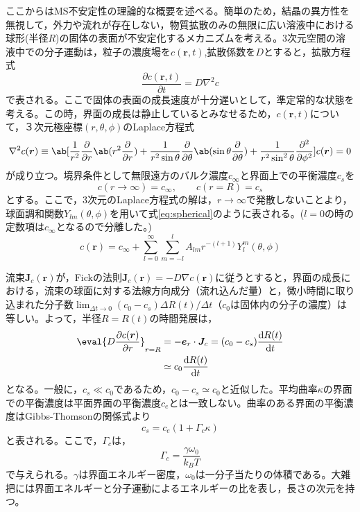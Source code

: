 \documentclass[autodetect-engine,dvi=dvipdfmx,a4paper,ja=standard,oneside,openany,11pt]{bxjsbook}
\begin{document}
ここからはMS不安定性の理論的な概要を述べる。簡単のため，結晶の異方性を無視して，外力や流れが存在しない，物質拡散のみの無限に広い溶液中における球形(半径$R$)の固体の表面が不安定化するメカニズムを考える\cite{フラクタル科学}\cite{mullins1963morphological}。3次元空間の溶液中での分子運動は，粒子の濃度場を$c(\bm{r},t)$,拡散係数を$D$とすると，拡散方程式
\begin{equation}
  \frac{\partial c(\bm{r},t)}{\partial t} = D\nabla^2c
  \label{eq:diffusion}
\end{equation}
で表される。ここで固体の表面の成長速度が十分遅いとして，準定常的な状態を考える。この時，界面の成長は静止しているとみなせるため，$c(\bm{r},t)$について，３次元極座標$(r,\theta,\phi)$のLaplace方程式
\begin{equation}
  \nabla^2c(\bm{r})\equiv \ab[\frac{1}{r^2}\pdv*{\ab(r^2\pdv{}{r})}{r}+\frac{1}{r^2\sin\theta}\pdv*{\ab(\sin\theta\pdv{}{\theta})}{\theta}+\frac{1}{r^2\sin^2\theta}\pdv[2]{}{\phi}]c(\bm{r})=0
  \label{eq:laplace}
\end{equation}
が成り立つ。境界条件として無限遠方のバルク濃度$c_{\infty}$と界面上での平衡濃度$c_s$を
\begin{equation}
  c(r\rightarrow \infty)  = c_{\infty}, \qquad c(r=R)= c_s
  \label{eq:boundary}
\end{equation}
とする。ここで，3次元のLaplace方程式の解は，$r\to\infty$で発散しないことより，球面調和関数$Y_{lm}(\theta,\phi)$を用いて式\eqref{eq:spherical}のように表される。($l=0$の時の定数項は$c_\infty$となるので分離した。)
\begin{equation}
  c(\bm{r}) = c_{\infty} + \sum_{l=0}^{\infty}\sum_{m=-l}^{l}A_{lm}r^{-(l+1)}Y_{l}^{m}(\theta,\phi)
  \label{eq:spherical}
\end{equation}

流束$\bm{J}_c(\bm{r})$が，Fickの法則$\bm{J}_c(\bm{r})=-D\nabla c(\bm{r})$に従うとすると，界面の成長における，流束の球面に対する法線方向成分（流れ込んだ量）と，微小時間に取り込まれた分子数$\lim_{\Delta t\to 0} (c_0-c_s)\Delta R(t)/\Delta t$（$c_0$は固体内の分子の濃度）は等しい。よって，半径$R=R(t)$の時間発展は，
\begin{equation}
  \begin{split}
    \eval{D\pdv{c(\bm{r})}{r}}_{r=R} & = -\bm{e}_r\cdot\bm{J}_c = (c_0-c_s)\odv{R(t)}{t} \\
                                     & \simeq c_0\odv{R(t)}{t}
  \end{split}
  \label{eq:R}
\end{equation}
となる。一般に，$c_s\ll c_0$であるため，$c_0-c_s\simeq c_0$と近似した。平均曲率$\kappa$の界面での平衡濃度は平面界面の平衡濃度$c_e$とは一致しない。曲率のある界面の平衡濃度はGibbs-Thomsonの関係式より
\begin{equation}
  c_s = c_e(1+\Gamma_c \kappa)
  \label{eq:Gibbs-Thomson}
\end{equation}
と表される。ここで，$\Gamma_c$は，
\begin{equation}
  \Gamma_c = \frac{\gamma \omega_0}{k_BT}
\end{equation}
で与えられる。$\gamma$は界面エネルギー密度，$\omega_0$は一分子当たりの体積である。大雑把には界面エネルギーと分子運動によるエネルギーの比を表し，長さの次元を持つ。
\end{document}
